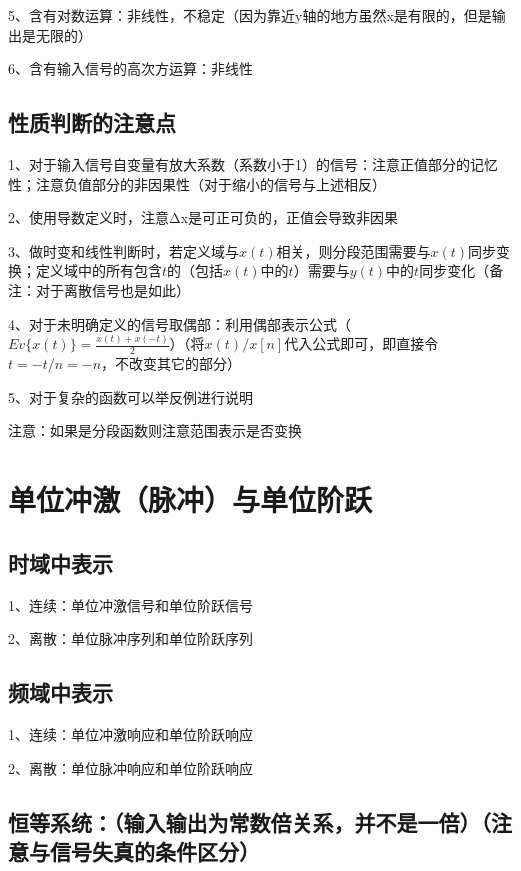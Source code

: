 5、含有对数运算：非线性，不稳定（因为靠近y轴的地方虽然x是有限的，但是输出是无限的）

6、含有输入信号的高次方运算：非线性



\subsection{性质判断的注意点}

1、对于输入信号自变量有放大系数（系数小于1）的信号：注意正值部分的记忆性；注意负值部分的非因果性（对于缩小的信号与上述相反）

2、使用导数定义时，注意Δx是可正可负的，正值会导致非因果

3、做时变和线性判断时，若定义域与$x(t)$相关，则分段范围需要与$x(t)$同步变换；定义域中的所有包含$t$的（包括$x(t)$中的$t$）需要与$y(t)$中的$t$同步变化（备注：对于离散信号也是如此）

4、对于未明确定义的信号取偶部：利用偶部表示公式（$Ev\{x(t)\}=\frac{x(t)+x(-t)}{2}$）（将$x(t)/x[n]$代入公式即可，即直接令$t=-t/n=-n$，不改变其它的部分）

5、对于复杂的函数可以举反例进行说明

注意：如果是分段函数则注意范围表示是否变换

\section{单位冲激（脉冲）与单位阶跃}



\subsection{时域中表示}

1、连续：单位冲激信号和单位阶跃信号

2、离散：单位脉冲序列和单位阶跃序列



\subsection{频域中表示}

1、连续：单位冲激响应和单位阶跃响应

2、离散：单位脉冲响应和单位阶跃响应



\subsection{恒等系统：（输入输出为常数倍关系，并不是一倍）（注意与信号失真的条件区分）}

